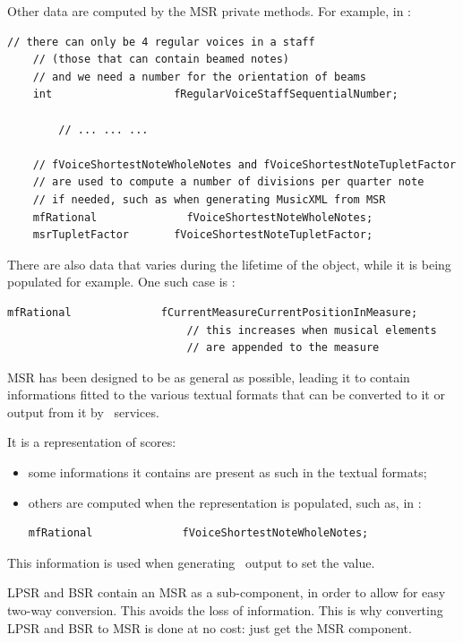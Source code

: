 Other data are computed by the MSR private methods. For example, in :
\begin{lstlisting}[language=CPlusPlus]
    // there can only be 4 regular voices in a staff
    // (those that can contain beamed notes)
    // and we need a number for the orientation of beams
    int                   fRegularVoiceStaffSequentialNumber;

		// ... ... ...

    // fVoiceShortestNoteWholeNotes and fVoiceShortestNoteTupletFactor
    // are used to compute a number of divisions per quarter note
    // if needed, such as when generating MusicXML from MSR
    mfRational              fVoiceShortestNoteWholeNotes;
    msrTupletFactor       fVoiceShortestNoteTupletFactor;
\end{lstlisting}

There are also data that varies during the lifetime of the object, while it is being populated for example.
One such case is :
\begin{lstlisting}[language=CPlusPlus]
    mfRational              fCurrentMeasureCurrentPositionInMeasure;
                            // this increases when musical elements
                            // are appended to the measure
\end{lstlisting}

MSR has been designed to be as general as possible, leading it to contain informations fitted to the various textual formats that can be converted to it or output from it by \mf\ services.

It is a  representation of scores:
\begin{itemize}
\item some informations it contains are present as such in the textual formats;
\item others are computed when the representation is populated, such as, in :
\begin{lstlisting}[language=CPlusPlus]
    mfRational              fVoiceShortestNoteWholeNotes;
\end{lstlisting}
\end{itemize}
This information is used when generating \mxml\ output to set the  value.

LPSR and BSR contain an MSR as a sub-component, in order to allow for easy two-way conversion. This avoids the loss of information. This is why converting LPSR and BSR to MSR is done at no cost: just get the MSR component.

